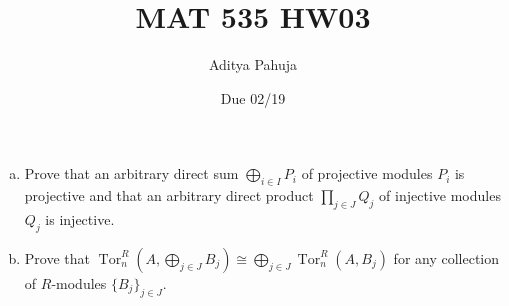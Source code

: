 \documentclass[10pt]{article}
\title{MAT 535 HW03}
\author{\large Aditya Pahuja}
\date{\large Due 02/19}
\providecommand{\tor}{\operatorname{Tor}}
\providecommand{\ii}{\item}
\begin{document}
\maketitle

\begin{problem}
    [\S17.1\#10a,d]
    \begin{enumerate}[(a)]
	\ii Prove that an arbitrary direct sum $\bigoplus_{i\in I} P_i$
	of projective modules $P_i$ is projective
	and that an arbitrary direct product $\prod_{j\in J}Q_j$
	of injective modules $Q_j$ is injective.
	\setcounter{enumi}{3}
	\ii Prove that $\tor^R_n(A,\bigoplus_{j\in J}B_j)
	\cong\bigoplus_{j\in J}\tor^R_n(A,B_j)$
	for any collection of $R$-modules $\{B_j\}_{j\in J}$.
    \end{enumerate}
\end{problem}
\end{document}
